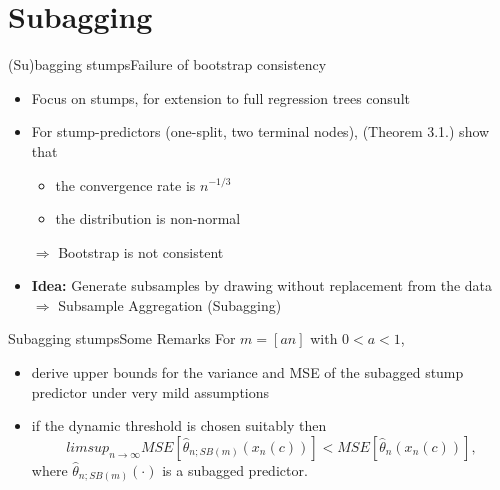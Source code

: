 \documentclass{beamer}
\begin{document}
\section{Subagging}
\begin{frame}{(Su)bagging stumps}{Failure of bootstrap consistency}
\begin{itemize}
\item Focus on stumps, for extension to full regression trees consult \cite{Buhlmann2002}
\item For stump-predictors (one-split, two terminal nodes), \cite{Buhlmann2002} (Theorem 3.1.) show that
\begin{itemize}
	\item{the convergence rate is $n^{-1/3}$}
    \item{the distribution is non-normal}
\end{itemize}
$\Rightarrow$ Bootstrap is not consistent\\

\item \textbf{Idea:} Generate subsamples by drawing without replacement from the data\\
$\Rightarrow$ Subsample Aggregation (Subagging)\
\end{itemize}

\end{frame}



\begin{frame}{Subagging stumps}{Some Remarks}
For $m = [an]$ with $0 < a < 1$,
\begin{itemize}
\item derive upper bounds for the variance and MSE of the subagged stump predictor under very mild assumptions
\item if the dynamic threshold is chosen suitably then
$$
limsup_{n \rightarrow \infty}MSE[\hat{\theta}_{n;SB(m)}(x_{n}(c))] < MSE[\hat{\theta}_{n}(x_{n}(c))],
$$
where $\hat{\theta}_{n;SB(m)}(\cdot)$ is a subagged predictor.


\end{itemize}

\end{frame}
\end{document}
